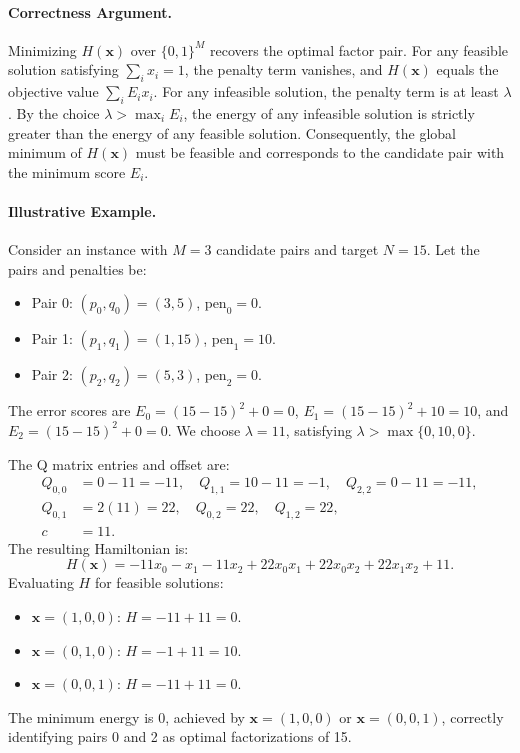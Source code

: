 \documentclass[12pt]{article}
\begin{document}
\paragraph{Correctness Argument.}
Minimizing $H(\mathbf{x})$ over $\{0,1\}^M$ recovers the optimal factor pair. For any feasible solution satisfying $\sum_i x_i = 1$, the penalty term vanishes, and $H(\mathbf{x})$ equals the objective value $\sum_i E_i x_i$. For any infeasible solution, the penalty term is at least $\lambda$. By the choice $\lambda > \max_i E_i$, the energy of any infeasible solution is strictly greater than the energy of any feasible solution. Consequently, the global minimum of $H(\mathbf{x})$ must be feasible and corresponds to the candidate pair with the minimum score $E_i$.

\paragraph{Illustrative Example.}
Consider an instance with $M=3$ candidate pairs and target $N=15$. Let the pairs and penalties be:
\begin{itemize}
    \item Pair 0: $(p_0, q_0) = (3, 5)$, $\text{pen}_0 = 0$.
    \item Pair 1: $(p_1, q_1) = (1, 15)$, $\text{pen}_1 = 10$.
    \item Pair 2: $(p_2, q_2) = (5, 3)$, $\text{pen}_2 = 0$.
\end{itemize}
The error scores are $E_0 = (15-15)^2 + 0 = 0$, $E_1 = (15-15)^2 + 10 = 10$, and $E_2 = (15-15)^2 + 0 = 0$.
We choose $\lambda = 11$, satisfying $\lambda > \max\{0, 10, 0\}$.

The Q matrix entries and offset are:
\begin{align}
Q_{0,0} &= 0 - 11 = -11, \quad Q_{1,1} = 10 - 11 = -1, \quad Q_{2,2} = 0 - 11 = -11, \\
Q_{0,1} &= 2(11) = 22, \quad Q_{0,2} = 22, \quad Q_{1,2} = 22, \\
c &= 11.
\end{align}
The resulting Hamiltonian is:
\[
H(\mathbf{x}) = -11 x_0 - x_1 - 11 x_2 + 22 x_0 x_1 + 22 x_0 x_2 + 22 x_1 x_2 + 11.
\]
Evaluating $H$ for feasible solutions:
\begin{itemize}
    \item $\mathbf{x} = (1,0,0)$: $H = -11 + 11 = 0$.
    \item $\mathbf{x} = (0,1,0)$: $H = -1 + 11 = 10$.
    \item $\mathbf{x} = (0,0,1)$: $H = -11 + 11 = 0$.
\end{itemize}
The minimum energy is $0$, achieved by $\mathbf{x} = (1,0,0)$ or $\mathbf{x} = (0,0,1)$, correctly identifying pairs 0 and 2 as optimal factorizations of 15.
\end{document}
